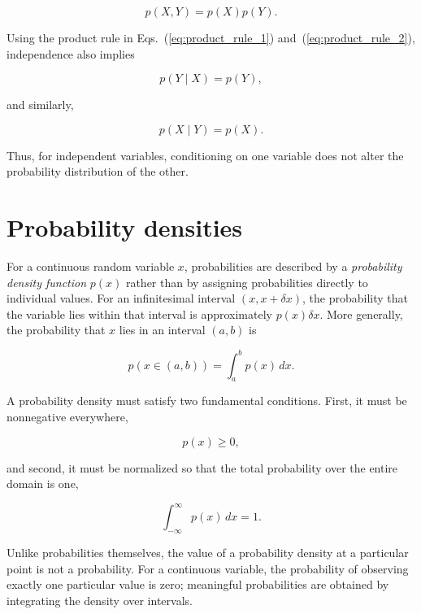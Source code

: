 \documentclass[10pt,twocolumn]{memoir}
\begin{document}
\begin{equation}
    p(X,Y) = p(X)p(Y).
\end{equation}

Using the product rule in Eqs.~(\ref{eq:product_rule_1}) and~(\ref{eq:product_rule_2}), independence also implies

\begin{equation}
    p(Y \mid X) = p(Y),
\end{equation}

and similarly,

\begin{equation}
    p(X \mid Y) = p(X).
\end{equation}

Thus, for independent variables, conditioning on one variable does not alter the probability distribution of the other.

\vspace{10pt}
\section{Probability densities}

For a continuous random variable $x$, probabilities are described by a \textit{probability density function} $p(x)$ rather than by assigning probabilities directly to individual values. For an infinitesimal interval $(x,x+\delta x)$, the probability that the variable lies within that interval is approximately $p(x)\delta x$. More generally, the probability that $x$ lies in an interval $(a,b)$ is

\begin{equation}
    p(x \in (a,b)) = \int_a^b p(x)\,dx.
\end{equation}

A probability density must satisfy two fundamental conditions. First, it must be nonnegative everywhere,

\begin{equation}
    p(x) \geq 0,
\end{equation}

and second, it must be normalized so that the total probability over the entire domain is one,

\begin{equation}
    \int_{-\infty}^{\infty} p(x)\,dx = 1.
\end{equation}

Unlike probabilities themselves, the value of a probability density at a particular point is not a probability. For a continuous variable, the probability of observing exactly one particular value is zero; meaningful probabilities are obtained by integrating the density over intervals.
\end{document}
